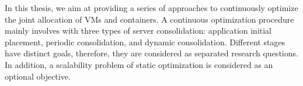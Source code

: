 


In this thesis, we aim at providing a series of approaches to continuously optimize the joint allocation of VMs and containers. A continuous optimization procedure mainly involves with three types of server consolidation: application initial placement, periodic consolidation, and dynamic consolidation. Different stages have distinct goals, therefore, they are considered as separated research questions. In addition, a scalability problem of static optimization is considered as an optional objective.

